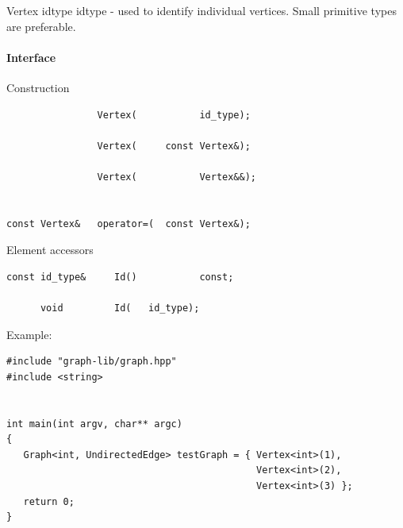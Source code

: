 \label{vertex_lbl}

Vertex idtype
idtype - used to identify individual vertices. Small primitive types are preferable.

\paragraph{Interface}


Construction

\begin{lstlisting}
                Vertex(           id_type);

                Vertex(     const Vertex&);

                Vertex(           Vertex&&);


const Vertex&   operator=(  const Vertex&);
\end{lstlisting}


Element accessors

\begin{lstlisting}
const id_type&     Id()           const;

      void         Id(   id_type);
\end{lstlisting}

Example:

\begin{lstlisting}
#include "graph-lib/graph.hpp"
#include <string>


int main(int argv, char** argc)
{
   Graph<int, UndirectedEdge> testGraph = { Vertex<int>(1),
                                            Vertex<int>(2),
                                            Vertex<int>(3) };
   return 0;
}

\end{lstlisting}